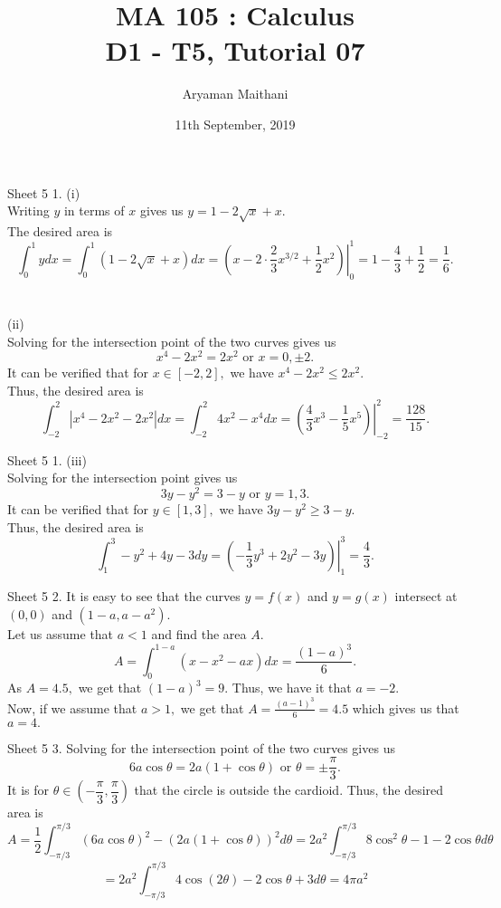 \documentclass[handout, aspectratio=169]{beamer}
\title{MA 105 : Calculus\\ D1 - T5, Tutorial 07}  %
\author{Aryaman Maithani}
\date[11-09-2019]{11th September, 2019}               %
\institute[IITB]{IIT Bombay}
\begin{document}
\begin{frame}
	\titlepage
\end{frame}
\begin{frame}{Sheet 5}                            %
	1. (i)\\
	Writing $y$ in terms of $x$ gives us $y = 1 - 2\sqrt{x} + x.$\\
	The desired area is $$\displaystyle\int_{0}^{1} y dx = \int_{0}^{1} (1 - 2\sqrt{x} + x) dx = \left.\left(x - 2\cdot\frac{2}{3}x^{3/2} + \frac{1}{2}x^2\right)\right|_{0}^{1} = 1 - \frac{4}{3} + \dfrac{1}{2} = \frac{1}{6}. $$\\~\\
	(ii)\\
	Solving for the intersection point of the two curves gives us
	\[x^4 - 2x^2 = 2x^2 \text{ or } x = 0, \pm 2.\]
	It can be verified that for $x \in [-2, 2],$ we have $x^4 - 2x^2 \le 2x^2.$\\
	Thus, the desired area is
	\[\int_{-2}^{2} |x^4 - 2x^2 - 2x^2| dx = \int_{-2}^{2} 4x^2 - x^4 dx = \left.\left(\frac{4}{3}x^3 - \frac{1}{5}x^5\right)\right|_{-2}^{2} = \frac{128}{15}.\]
	
\end{frame}
\begin{frame}{Sheet 5}
	1. (iii)\\
	Solving for the intersection point gives us
	\[3y - y^2 = 3 - y \text{ or } y = 1, 3.\]
	It can be verified that for $y \in [1, 3],$ we have $3y - y^2 \ge 3 - y.$\\
	Thus, the desired area is
	\[\int_{1}^{3} -y^2 + 4y - 3 dy = \left.\left(-\frac{1}{3}y^3 + 2y^2 - 3y\right)\right|_1^3 = \frac{4}{3}. \]
\end{frame}
\begin{frame}{Sheet 5}
	2. It is easy to see that the curves $y = f(x)$ and $y = g(x)$ intersect at $(0, 0)$ and $(1-a, a-a^2).$\\
	Let us assume that $a < 1$ and find the area $A.$
	\[A = \int_{0}^{1-a} (x - x^2 - ax) dx = \frac{(1-a)^3}{6}.\]
	As $A = 4.5,$ we get that $(1 - a)^3 = 9.$ Thus, we have it that $a = -2.$\\
	Now, if we assume that $a > 1,$ we get that $A = \frac{(a-1)^3}{6} = 4.5$ which gives us that $a = 4.$
\end{frame}
\begin{frame}{Sheet 5}
	3. Solving for the intersection point of the two curves gives us
	\[6a\cos\theta = 2a(1+\cos\theta) \text{ or } \theta = \pm\frac{\pi}{3}.\]
	It is for $\theta \in \left(-\dfrac{\pi}{3}, \dfrac{\pi}{3}\right)$ that the circle is outside the cardioid. Thus, the desired area is
	\[A = \frac{1}{2}\int_{-\pi/3}^{\pi/3} (6a\cos\theta)^2 - (2a(1 + \cos\theta))^2 d\theta = 2a^2\int_{-\pi/3}^{\pi/3} 8\cos^2\theta - 1 - 2\cos\theta d\theta\]
	\[= 2a^2\int_{-\pi/3}^{\pi/3} 4\cos(2\theta) - 2\cos\theta + 3 d\theta = 4\pi a^2 \]
\end{frame}
\end{document}
